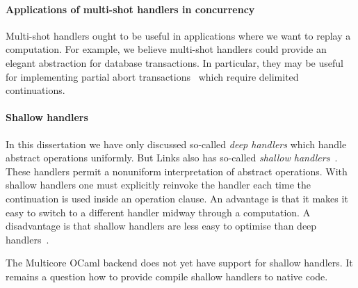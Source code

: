 \documentclass[12pt,mscres,cdtppar,twoside,openright,logo,rightchapter,normalheadings]{infthesis}
\theoremstyle{definition}
\begin{document}
\paragraph{Applications of multi-shot handlers in concurrency}
Multi-shot handlers ought to be useful in applications where we want
to replay a computation. For example, we believe multi-shot handlers
could provide an elegant abstraction for database transactions. In
particular, they may be useful for implementing partial abort
transactions~\citep{Le2015} which require delimited continuations.

\paragraph{Shallow handlers}
In this dissertation we have only discussed so-called \emph{deep
  handlers} which handle abstract operations uniformly.  But Links
also has so-called \emph{shallow handlers}~\citep{Kammar2013}. These
handlers permit a nonuniform interpretation of abstract
operations. With shallow handlers one must explicitly reinvoke the
handler each time the continuation is used inside an operation
clause. An advantage is that it makes it easy to switch to a different
handler midway through a computation.
%
A disadvantage is that shallow handlers are less easy to optimise than
deep handlers~\cite{Wu2015}.

The Multicore OCaml backend does not yet have support for shallow
handlers. It remains a question how to provide compile shallow
handlers to native code.




%

\singlespace



\end{document}

